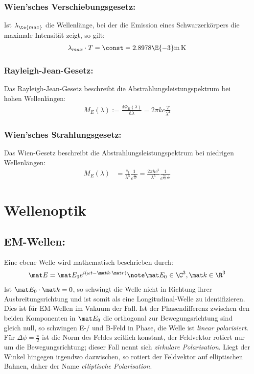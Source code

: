 \documentclass[twocolumn, unnumberedsubsub]{summery_3.1}
\begin{document}
\subsubsection{Wien'sches Verschiebungsgesetz:}
    Ist \(\lambda_{\te{max}}\) die Wellenlänge, bei der die Emission eines Schwarzerkörpers
    die maximale Intensität zeigt, so gilt:
    \begin{align*}
        \lambda_{max}\cdot T = \const = 2.8978 \E{-3} \mathrm{m\, K}
    \end{align*}\ttight

\subsubsection{Rayleigh-Jean-Gesetz:}
    Das Rayleigh-Jean-Gesetz beschreibt die Abstrahlungsleistungspektrum bei hohen Wellenlängen:
    \begin{align*}
        M_E(\lambda):= \frac{\mathrm  d \Phi_E(\lambda)}{\mathrm d\lambda}=2\pi k c\frac T{\lambda^4}
    \end{align*}\ttight

\subsubsection{Wien'sches Strahlungsgesetz:}
    Das Wien-Gesetz beschreibt die Abstrahlungsleistungspektrum bei niedrigen Wellenlängen:
    \begin{align*}
        M_E(\lambda) &= \frac{c_1}{\lambda^5} \frac{1}{e^{\frac{c_2}{\lambda T}}}
        = \frac{2\pi h  c^2}{\lambda^5} \frac{1}{e^{\frac{h c}{k_B}\frac{1}{\lambda T}}}
    \end{align*}\tight

\section{Wellenoptik}
\subsection{EM-Wellen:}
Eine ebene Welle wird mathematisch beschrieben durch:
\begin{align*}
    \mat E = \mat E_{0} e^{i(\omega t - \mat k \cdot \mat r)}\note \mat E_0\in\C^3, \mat k \in \R^3
\end{align*}
Ist \(\mat E_0\cdot \mat k = 0\), so schwingt die Welle nicht in Richtung ihrer Ausbreitungsrichtung und
ist somit als eine Longitudinal-Welle zu identifizieren. Dies ist für EM-Wellen im Vakuum der Fall.
Ist der Phasendifferenz zwischen den beiden Komponenten in \(\mat E_0\) die orthogonal zur 
Bewegungsrichtung sind gleich null, so schwingen E-/ und B-Feld in Phase, die Welle ist 
\emph{linear polarisiert}. Für \(\Delta \phi = \frac\pi2\) ist die Norm des Feldes zeitlich konstant, 
der Feldvektor rotiert nur um die Bewegungsrichtung; dieser Fall nennt sich \emph{zirkulare Polarisation}.
Liegt der Winkel hingegen irgendwo dazwischen, so rotiert der Feldvektor auf elliptischen 
Bahnen, daher der Name \emph{elliptische Polarisation}.
\end{document}
